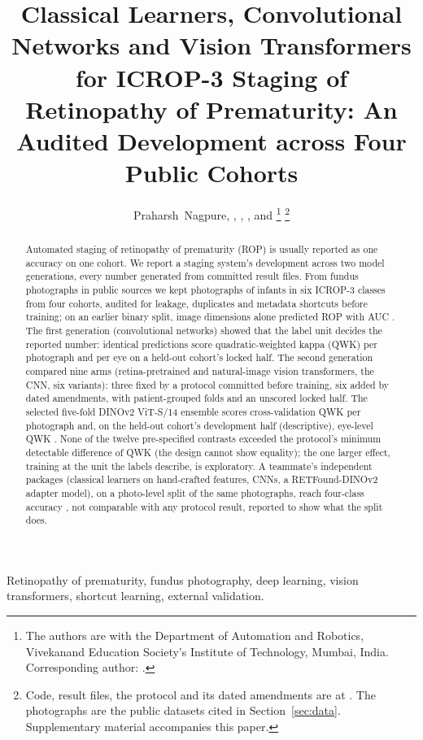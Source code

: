 \documentclass[journal]{IEEEtran}
\title{Classical Learners, Convolutional Networks and Vision Transformers for ICROP-3 Staging of Retinopathy of Prematurity: An Audited Development across Four Public Cohorts}
\author{Praharsh~Nagpure, \FILL{R. Bait full name}, \FILL{P. Rangnekar full name}, \FILL{Y. Shengale full name}, and \FILL{A. Kumar full name}%
\thanks{The authors are with the Department of Automation and Robotics, Vivekanand Education Society's Institute of Technology, Mumbai, India. Corresponding author: \FILL{name, e-mail, ORCID}.}%
\thanks{Code, result files, the protocol and its dated amendments are at \FILL{repository URL, tagged release and Zenodo DOI}. The photographs are the public datasets cited in Section~\ref{sec:data}. Supplementary material accompanies this paper.}}
\begin{document}
\maketitle

\begin{abstract}
Automated staging of retinopathy of prematurity (ROP) is usually reported as one accuracy on one cohort. We report a staging system's development across two model generations, every number generated from committed result files. From \acqImages{} fundus photographs in \acqSources{} public sources we kept \sixElig{} photographs of \sixInfants{} infants in six ICROP-3 classes from four cohorts, audited for leakage, duplicates and metadata shortcuts before training; on an earlier binary split, image dimensions alone predicted ROP with AUC \shortcutAUC{}. The first generation (convolutional networks) showed that the label unit decides the reported number: identical predictions score quadratic-weighted kappa (QWK) \vTwoLockedImgQ{} per photograph and \vTwoLockedEyeQ{} per eye on a held-out cohort's locked half. The second generation compared nine arms (retina-pretrained and natural-image vision transformers, the CNN, six variants): three fixed by a protocol committed before training, six added by dated amendments, with patient-grouped folds and an unscored locked half. The selected five-fold DINOv2 ViT-S/14 ensemble scores cross-validation QWK \BcvQ{} \BcvQci{} per photograph and, on the held-out cohort's development half (descriptive), eye-level QWK \BdevQ{} \BdevQci{}. None of the twelve pre-specified contrasts exceeded the protocol's minimum detectable difference of \mdd{} QWK (the design cannot show equality); the one larger effect, training at the unit the labels describe, is exploratory. A teammate's independent packages (classical learners on hand-crafted features, CNNs, a RETFound-DINOv2 adapter model), on a photo-level split of the same photographs, reach four-class accuracy \mateBestAcc{}, not comparable with any protocol result, reported to show what the split does.
\end{abstract}

\begin{IEEEkeywords}
Retinopathy of prematurity, fundus photography, deep learning, vision transformers, shortcut learning, external validation.
\end{IEEEkeywords}
\end{document}
